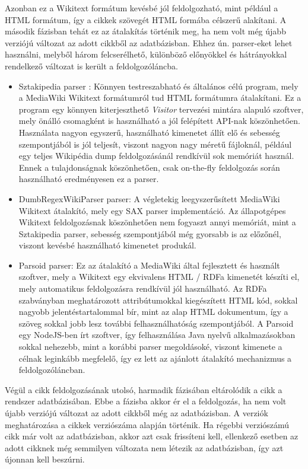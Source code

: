 Azonban ez a Wikitext formátum kevésbé jól feldolgozható, mint például a HTML formátum, így a cikkek szövegét HTML formába célszerű alakítani. A második fázisban tehát ez az átalakítás történik meg, ha nem volt még újabb verziójú változat az adott cikkből az adatbázisban. Ehhez ún. parser-eket lehet használni, melyből három felcserélhető, különböző előnyökkel és hátrányokkal rendelkező változat is került a feldolgozóláncba.

\begin{itemize}
	\item Sztakipedia parser \cite{sztakipediaparser}: Könnyen testreszabható és általános célú program, mely a MediaWiki Wikitext formátumról tud HTML formátumra átalakítani. Ez a program egy könnyen kiterjeszthető \textit{Visitor} tervezési mintára alapuló szoftver, mely önálló csomagként is használható a jól felépített API-nak köszönhetően. Használata nagyon egyszerű, használható kimenetet állít elő és sebesség szempontjából is jól teljesít, viszont nagyon nagy méretű fájloknál, például egy teljes Wikipédia dump feldolgozásánál rendkívül sok memóriát használ. Ennek a tulajdonságnak köszönhetően, csak on-the-fly feldolgozás során használható eredményesen ez a parser.
	
	\item DumbRegexWikiParser parser: A végletekig leegyszerűsített MediaWiki Wikitext átalakító, mely egy SAX parser implementáció. Az állapotgépes Wikitext feldolgozásnak köszönhetően nem fogyaszt annyi memóriát, mint a Sztakipedia parser, sebesség szempontjából még gyorsabb is az előzőnél, viszont kevésbé használható kimenetet produkál.
	
	\item Parsoid parser: Ez az átalakító a MediaWiki által fejlesztett és használt szoftver, mely a Wikitext egy ekvivalens HTML / RDFa kimenetét készíti el, mely automatikus feldolgozásra rendkívül jól használható. Az RDFa szabványban meghatározott attribútumokkal kiegészített HTML kód, sokkal nagyobb jelentéstartalommal bír, mint az alap HTML dokumentum, így a szöveg sokkal jobb lesz további felhasználhatóság szempontjából. A Parsoid egy NodeJS-ben írt szoftver, így felhasználása Java nyelvű alkalmazásokban sokkal nehezebb, mint a korábbi parser megoldásoké, viszont kimenete a célnak leginkább megfelelő, így ez lett az ajánlott átalakító mechanizmus a feldolgozóláncban.
\end{itemize}

Végül a cikk feldolgozásának utolsó, harmadik fázisában eltárolódik a cikk a rendszer adatbázisában. Ebbe a fázisba akkor ér el a feldolgozás, ha nem volt újabb verziójú változat az adott cikkből még az adatbázisban. A verziók meghatározása a cikkek verziószáma alapján történik. Ha régebbi verziószámú cikk már volt az adatbázisban, akkor azt csak frissíteni kell, ellenkező esetben az adott cikknek még semmilyen változata nem létezik az adatbázisban, így azt újonnan kell beszúrni.

